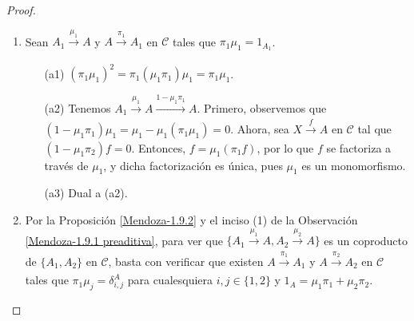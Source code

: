\documentclass[tesis]{subfiles}
\begin{document}
\begin{proof}\leavevmode

    \begin{enumerate}[label=(\alph*)]
    
        \item Sean $A_1\xrightarrow[]{\mu_1}A$ y $A\xrightarrow[]{\pi_1}A_1$ en $\mathscr{C}$ tales que $\pi_1\mu_1=1_{A_1}$.

            \begin{itemize}
            
                \item[(a1)] $(\pi_1\mu_1)^2 = \pi_1(\mu_1\pi_1)\mu_1 = \pi_1\mu_1$.

                \item[(a2)] Tenemos $A_1\xrightarrow[]{\mu_1}A\xrightarrow[]{1-\mu_1\pi_1} A$. Primero, observemos que $(1-\mu_1\pi_1)\mu_1 = \mu_1 - \mu_1(\pi_1\mu_1) = 0$. Ahora, sea $X\xrightarrow[]{f}A$ en $\mathscr{C}$ tal que $(1-\mu_1\pi_2)f = 0$. Entonces, $f=\mu_1(\pi_1f)$, por lo que $f$ se factoriza a través de $\mu_1$, y dicha factorización es única, pues $\mu_1$ es un monomorfismo.

                \item[(a3)] Dual a (a2).
            \end{itemize}

        \item Por la Proposición \ref{Mendoza-1.9.2} y el inciso (1) de la Observación \ref{Mendoza-1.9.1 preaditiva}, para ver que $\{ A_1\xrightarrow[]{\mu_1}A, A_2\xrightarrow[]{\mu_2}A \}$ es un coproducto de $\{A_1,A_2\}$ en $\mathscr{C}$, basta con verificar que existen $A\xrightarrow[]{\pi_1}A_1$ y $A\xrightarrow[]{\pi_2}A_2$ en $\mathscr{C}$ tales que $\pi_1\mu_j = \delta_{i,j}^A$ para cualesquiera $i,j\in\{1,2\}$ y $1_A = \mu_1\pi_1 + \mu_2\pi_2$.


\end{enumerate}
\end{proof}
\end{document}
